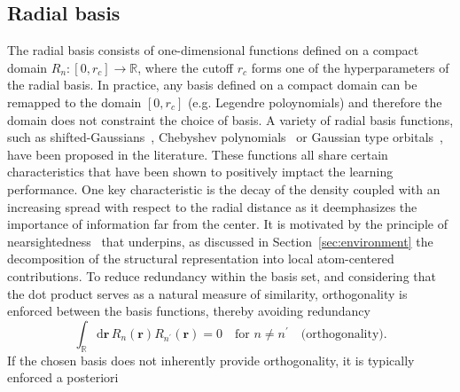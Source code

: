 \subsection{Radial basis}
\label{sec:radial_basis_set}
The radial basis consists of one-dimensional functions defined on a compact domain $R_n:[0, r_c]\rightarrow\mathbb{R}$, where the cutoff $r_c$ forms one of the hyperparameters of the radial basis.
In practice, any basis defined on a compact domain can be remapped to the domain $[0, r_c]$ (e.g. Legendre poloynomials) and therefore the domain does not constraint the choice of basis.
A variety of radial basis functions, such as shifted-Gaussians~\cite{bart+13prb}, Chebyshev polynomials~\cite{shapeev2016moment,drautz2019atomic} or Gaussian type orbitals~\cite{musil2021efficient}, have been proposed in the literature.
These functions all share certain characteristics that have been shown to positively imptact the learning performance. 
One key characteristic is the decay of the density   
 coupled with an increasing spread with respect to the radial distance as it deemphasizes the importance of information far from the center.
 It is motivated by the principle of nearsightedness~\cite{prodan2005nearsightedness} that underpins, as discussed in Section~\ref{sec:environment} the decomposition of the structural representation into local atom-centered contributions.
To reduce redundancy within the basis set, and considering that the dot product serves as a natural measure of similarity, orthogonality is enforced between the basis functions, thereby avoiding redundancy
\begin{equation}
  \int_\mathbb{R}\mathrm{d}\mathbf{r}\,R_n(\mathbf{r})R_{n^\prime}(\mathbf{r}) = 0\quad\textrm{for }n\neq n^\prime\quad \text{(orthogonality)}.
\end{equation}
If the chosen basis does not inherently provide orthogonality, it is typically enforced a posteriori %
